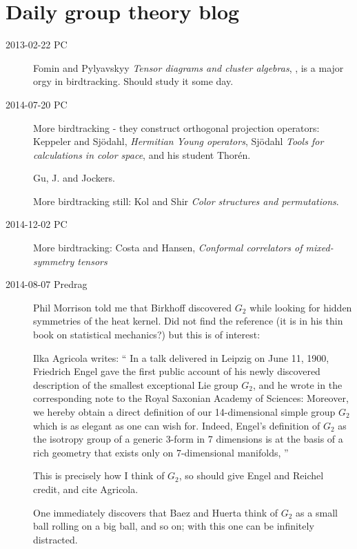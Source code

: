 \section{Daily group theory blog}
\label{s-groupTheBlog}



\begin{description}

\item[2013-02-22 PC] Fomin and Pylyavskyy
{\em Tensor diagrams and cluster algebras}, {},
is a major orgy in birdtracking. Should study it some day.

\item[2014-07-20 PC] More birdtracking - they construct orthogonal
projection operators: Keppeler and
    Sj{\"o}dahl, {\em Hermitian {Young} operators},
    Sj{\"o}dahl {\em Tools for calculations in
    color space}, and his student Thor{\'e}n.

Gu, J. and Jockers.

More birdtracking still:
Kol and Shir {\em Color structures and permutations}.

\item[2014-12-02 PC] More birdtracking:
Costa and Hansen,
{\em Conformal correlators of mixed-symmetry tensors}

\item[2014-08-07  Predrag]
Phil Morrison told me that Birkhoff discovered $G_2$ while looking for
hidden symmetries of the heat kernel. Did not find the reference (it is
in his thin book on statistical mechanics?) but this is of interest:

Ilka Agricola writes:
``
In a talk delivered in Leipzig on June 11, 1900, Friedrich
Engel gave the first public account of his newly discovered
description of the smallest exceptional Lie group $G_2$, and he wrote in
the corresponding note to the Royal Saxonian Academy of Sciences:
Moreover, we hereby obtain a direct definition of our 14-dimensional
simple group $G_2$ which is as elegant as one can wish for. Indeed,
Engel's definition of $G_2$ as the isotropy group of a generic 3-form in
7 dimensions is at the basis of a rich geometry that exists only on
7-dimensional manifolds,
''

This is precisely how I think of $G_2$, so should give Engel and
Reichel credit, and
cite Agricola.

One immediately discovers that Baez and Huerta think of
$G_2$ as a small ball rolling on a big ball, and so on; with this one can
be infinitely distracted.


\end{description}
